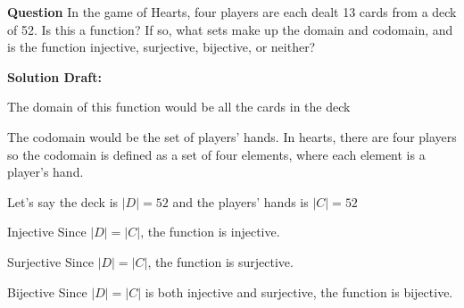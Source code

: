 \documentclass{article}
\begin{document}
\vspace{0.5cm} %

\noindent\textbf{Question}
In the game of Hearts, four players are each dealt 13 cards from a deck of 52. Is this a function? If so, what sets make up the domain and codomain, and is the function injective, surjective, bijective, or neither?


\noindent\textbf{Solution Draft:} 

The domain of this function would be all the cards in the deck

The codomain would be the set of players' hands. In hearts, there are four players so the codomain is defined as a set of four elements, where each element is a player's hand.

Let's say the deck is $|D| = 52$ and the players' hands is $|C| = 52$

Injective
Since $|D| = |C|$, the function is injective.

Surjective
Since $|D| = |C|$, the function is surjective.

Bijective
Since $|D| = |C|$ is both injective and surjective, the function is bijective.
\end{document}
